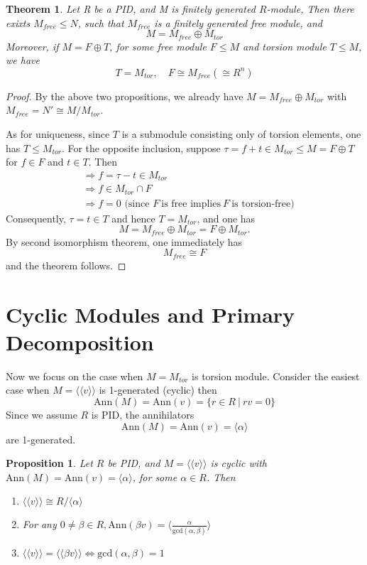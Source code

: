 \documentclass[11pt,openany]{book}
\theoremstyle{plain}
\newtheorem{theorem}{Theorem}[chapter]
\newtheorem{proposition}[proposition]{Proposition}
\theoremstyle{definition}
\theoremstyle{remark}
\begin{document}
\begin{theorem}
    Let R be a PID, and M is finitely generated $R$-module, Then there exixts $M_{free}\leq N$, such that $M_{free}$ is a finitely generated free module, and 
    $$M=M_{free}\oplus M_{tor}$$
    Moreover, if $M=F\oplus T$, for some free module $F\leq M$ and torsion module $T\leq M$, we have 
    $$T=M_{tor},\quad F\cong M_{free}(\cong R^n)$$
\end{theorem}

\begin{proof}
    By the above two propositions, we already have 
    $M= M_{free} \oplus M_{tor}$ with $M_{free} = N'\cong M/M_{tor}$.

    As for uniqueness, since $T$ is a submodule consisting only of torsion elements, one has $T\leq M_{tor}$. For the opposite inclusion, suppose $\tau = f+t\in M_{tor}\leq M=F\oplus T$
    for $f \in F$ and $t \in T$. Then
    \begin{align*}
        &\Rightarrow f=\tau-t \in M_{tor} \\
        &\Rightarrow f\in M_{tor} \cap F \\
        &\Rightarrow f=0 \text{ (since } F\ \text{is free implies}\ F\ \text{is torsion-free)}
    \end{align*}
    Consequently, $\tau=t\in T$ and hence $T = M_{tor}$, and one has
    $$M=M_{free}\oplus M_{tor}=F\oplus M_{tor}.$$
    By second isomorphism theorem, one immediately has $$M_{free}\cong F$$
    and the theorem follows.
\end{proof}

\section{Cyclic Modules and Primary Decomposition}
Now we focus on the case when $M=M_{tor}$ is torsion module. Consider the easiest case when
$M=\langle\langle v \rangle\rangle$ is 1-generated (cyclic) then
$$\mathrm{Ann}(M)=\mathrm{Ann}(v)=\{r\in R\ |\ rv=0\}$$
Since we assume $R$ is PID, the annihilators
$$\mathrm{Ann}(M)=\mathrm{Ann}(v)=\langle \alpha \rangle $$ 
are 1-generated.

\begin{proposition} \label{prop-cyclic}
    Let $R$ be PID, and $M=\langle\langle v \rangle\rangle$ is cyclic with $\mathrm{Ann}(M)=\mathrm{Ann}(v)=\langle \alpha \rangle$, for some $\alpha\in R$. Then
    \begin{enumerate}
        \item $\langle\langle v \rangle\rangle \cong R/\langle \alpha \rangle$
        \item For any $0\neq\beta \in R, \mathrm{Ann}(\beta v)=\langle \frac{\alpha}{\mathrm{gcd}(\alpha , \beta)}\rangle$
        \item $\langle \langle v\rangle \rangle = \langle\langle \beta v\rangle\rangle \Leftrightarrow \mathrm{gcd}(\alpha,\beta)=1$
    \end{enumerate}
\end{proposition}
\end{document}
